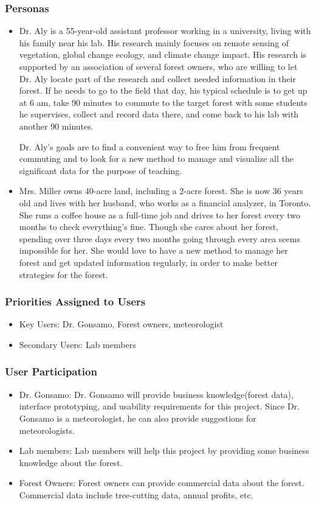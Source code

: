 \documentclass{article}
\begin{document}
\subsubsection{Personas}
\begin{itemize}
    \item Dr. Aly is a 55-year-old assistant professor working in a university, living with his family near his lab. His research mainly focuses on remote sensing of vegetation, global change ecology, and climate change impact. His research is supported by an association of several forest owners, who are willing to let Dr. Aly locate part of the research and collect needed information in their forest. If he needs to go to the field that day, his typical schedule is to get up at 6 am, take 90 minutes to commute to the target forest with some students he supervises, collect and record data there, and come back to his lab with another 90 minutes. 
    
    Dr. Aly's goals are to find a convenient way to free him from frequent commuting and to look for a new method to manage and visualize all the significant data for the purpose of teaching. 
    
    \item Mrs. Miller owns 40-acre land, including a 2-acre forest. She is now 36 years old and lives with her husband, who works as a financial analyzer, in Toronto. She runs a coffee house as a full-time job and drives to her forest every two months to check everything's fine. Though she cares about her forest, spending over three days every two months going through every area seems impossible for her. She would love to have a new method to manage her forest and get updated information regularly, in order to make better strategies for the forest. 
\end{itemize}

\subsubsection{Priorities Assigned to Users}
\begin{itemize}
    \item Key Users: Dr. Gonsamo, Forest owners, meteorologist
    \item Secondary Users: Lab members
\end{itemize}

\subsubsection{User Participation}
\begin{itemize}
    \item Dr. Gonsamo: Dr. Gonsamo will provide business knowledge(forest data), 
    interface prototyping, and usability requirements for this project. Since Dr. Gonsamo is 
    a meteorologist, he can also provide suggestions for meteorologists.
    \item Lab members: Lab members will help this project by providing some business knowledge
    about the forest.
    \item Forest Owners: Forest owners can provide commercial data about the forest. Commercial
    data include tree-cutting data, annual profits, etc.
\end{itemize}
\end{document}
